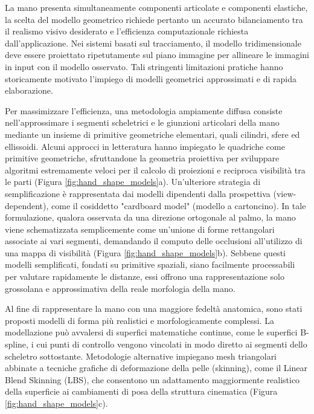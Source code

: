 La mano presenta simultaneamente componenti articolate e componenti elastiche, la scelta del modello geometrico richiede pertanto un accurato bilanciamento tra il realismo visivo desiderato e l'efficienza computazionale richiesta dall'applicazione. 
Nei sistemi basati sul tracciamento, il modello tridimensionale deve essere proiettato ripetutamente sul piano immagine per allineare le immagini in input con il modello osservato.
Tali stringenti limitazioni pratiche hanno storicamente motivato l'impiego di modelli geometrici approssimati e di rapida elaborazione.

Per massimizzare l'efficienza, una metodologia ampiamente diffusa consiste nell'approssimare i segmenti scheletrici e le giunzioni articolari della mano mediante un insieme di primitive geometriche elementari, quali cilindri, sfere ed ellissoidi. 
Alcuni approcci in letteratura hanno impiegato le quadriche come primitive geometriche, sfruttandone la geometria proiettiva per sviluppare algoritmi estremamente veloci per il calcolo di proiezioni e reciproca visibilità tra le parti (Figura \ref{fig:hand_shape_models}a).
Un'ulteriore strategia di semplificazione è rappresentata dai modelli dipendenti dalla prospettiva (view-dependent), come il cosiddetto "cardboard model" (modello a cartoncino).
In tale formulazione, qualora osservata da una direzione ortogonale al palmo, la mano viene schematizzata semplicemente come un'unione di forme rettangolari associate ai vari segmenti, demandando il computo delle occlusioni all'utilizzo di una mappa di visibilità (Figura \ref{fig:hand_shape_models}b). 
Sebbene questi modelli semplificati, fondati su primitive spaziali, siano facilmente processabili per valutare rapidamente le distanze, essi offrono una rappresentazione solo grossolana e approssimativa della reale morfologia della mano.

Al fine di rappresentare la mano con una maggiore fedeltà anatomica, sono stati proposti modelli di forma più realistici e morfologicamente complessi.
La modellazione può avvalersi di superfici matematiche continue, come le superfici B-spline, i cui punti di controllo vengono vincolati in modo diretto ai segmenti dello scheletro sottostante. 
Metodologie alternative impiegano mesh triangolari abbinate a tecniche grafiche di deformazione della pelle (skinning), come il Linear Blend Skinning (LBS), che consentono un adattamento maggiormente realistico della superficie ai cambiamenti di posa della struttura cinematica (Figura \ref{fig:hand_shape_models}c).

